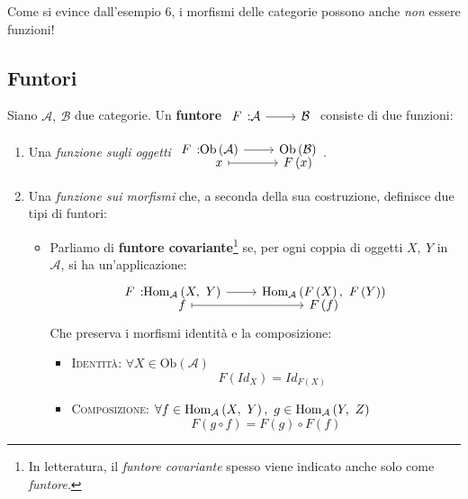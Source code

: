\begin{attention}
	Come si evince dall'esempio 6, i morfismi delle categorie possono anche \textit{non} essere funzioni!
\end{attention}
\subsection{Funtori} 
\begin{define}
Siano $\mathcal{A},\ \mathcal{B}$ due categorie. Un \textbf{funtore} $\funz{F}{\mathcal{A}}{\mathcal{B}}$ consiste di due funzioni:
\begin{enumerate}
	\item Una \textit{funzione sugli oggetti} $\funztot{F}{\mathrm{Ob}\left(\mathcal{A}\right)}{\mathrm{Ob}\left(\mathcal{B}\right)}{x}{F\left(x\right)}$.
	\item Una \textit{funzione sui morfismi} che, a seconda della sua costruzione, definisce due tipi di funtori:
	\begin{itemize}
		\item Parliamo di \textbf{funtore covariante}\footnote{In letteratura, il \textit{funtore covariante} spesso viene indicato anche solo come \textit{funtore}.} se, per ogni coppia di oggetti $X,\ Y$ in $\mathcal{A}$, si ha un'applicazione:
		\begin{equation}
			\funztot{F}{\homo{\mathcal{A}}{X}{Y}}{\homo{\mathcal{A}}{F\left(X\right)}{F\left(Y\right)}}{f}{F\left(f\right)}
		\end{equation}
	Che preserva i morfismi identità e la composizione:
	\begin{itemize}
		\item \textsc{Identità}: $\forall X\in \mathrm{Ob}\left(\mathcal{A}\right)$
		\begin{equation}
			\quad F\left(Id_X\right)=Id_{F\left(X\right)}
		\end{equation}
		\item \textsc{Composizione}: $\forall f\in\homo{\mathcal{A}}{X}{Y},\ g\in\homo{\mathcal{A}}{Y}{Z}$
		\begin{equation}
			F\left(g\circ f\right)=F\left(g\right)\circ F\left(f\right)
		\end{equation}
	\end{itemize}
	\begin{center}
\end{center}
\end{itemize}
\end{enumerate}
\end{define}

